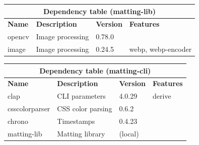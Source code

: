 \documentclass[a4paper]{article}
\begin{document}
\bgroup{}
\def\arraystretch{1.5}
\begin{center}
    \begin{tabular}{ |p{2cm}|p{4cm}|p{1.5cm}|p{2cm}| }
        \hline
        \multicolumn{4}{|c|}{\textbf{Dependency table (matting-lib)}} \\
        \hline
        \textbf{Name} & \textbf{Description} & \textbf{Version} & \textbf{Features} \\
        \hline
        opencv & Image processing & 0.78.0 & \- \\
        \hline
        image & Image processing & 0.24.5 & webp, webp-encoder \\
        \hline
    \end{tabular}
\end{center}
\egroup{}

\bgroup{}
\def\arraystretch{1.5}
\begin{center}
    \begin{tabular}{ |p{2cm}|p{4cm}|p{1.5cm}|p{2cm}| }
        \hline
        \multicolumn{4}{|c|}{\textbf{Dependency table (matting-cli)}} \\
        \hline
        \textbf{Name} & \textbf{Description} & \textbf{Version} & \textbf{Features} \\
        \hline
        clap & CLI parameters & 4.0.29 & derive \\
        \hline
        csscolorparser & CSS color parsing & 0.6.2 & \- \\
        \hline
        chrono & Timestamps & 0.4.23 & \- \\
        \hline
        matting-lib & Matting library & (local) & \- \\
        \hline
    \end{tabular}
\end{center}
\egroup{}
\end{document}
